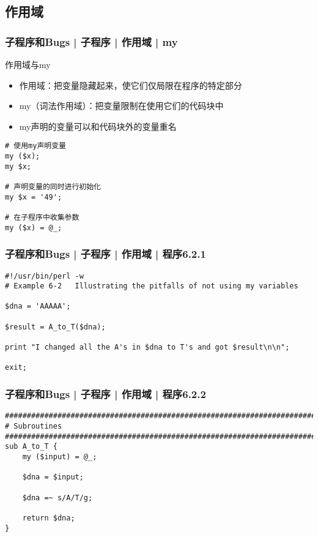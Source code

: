 \subsection{作用域}
\begin{frame}[fragile]
  \frametitle{子程序和Bugs | 子程序 | 作用域 | \alert{my}}
  \begin{block}{作用域与my}
    \begin{itemize}
      \item 作用域：把变量隐藏起来，使它们仅局限在程序的特定部分
      \item my（词法作用域）：把变量限制在使用它们的代码块中
      \item my声明的变量可以和代码块外的变量重名
    \end{itemize}
  \end{block}
  \pause
\begin{lstlisting}
# 使用my声明变量
my ($x);
my $x;

# 声明变量的同时进行初始化
my $x = '49';

# 在子程序中收集参数
my ($x) = @_;
\end{lstlisting}
\end{frame}

\begin{frame}[fragile]
  \frametitle{子程序和Bugs | 子程序 | 作用域 | 程序6.2.1}
\begin{lstlisting}[firstnumber=1]
#!/usr/bin/perl -w
# Example 6-2   Illustrating the pitfalls of not using my variables

$dna = 'AAAAA';

$result = A_to_T($dna);

print "I changed all the A's in $dna to T's and got $result\n\n";

exit;
\end{lstlisting}
\end{frame}

\begin{frame}[fragile]
  \frametitle{子程序和Bugs | 子程序 | 作用域 | 程序6.2.2}
\begin{lstlisting}[firstnumber=12,basicstyle=\small\tt]
################################################################################
# Subroutines
################################################################################
sub A_to_T {
    my ($input) = @_;

    $dna = $input;

    $dna =~ s/A/T/g;

    return $dna;
}
\end{lstlisting}
\end{frame}

